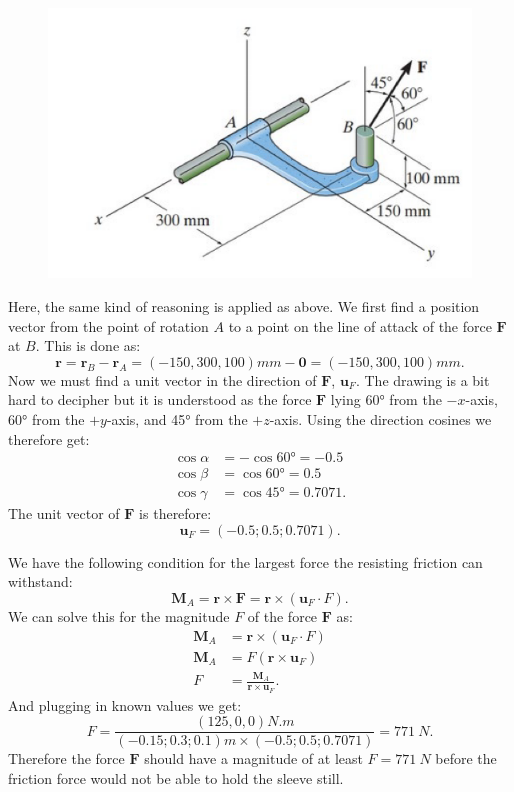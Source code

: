 \documentclass[a4paper]{article}
\begin{document}
\begin{figure} [ht]
  \centering
  \includegraphics[width=0.35\linewidth]{../figures/P2_2.png}
\end{figure}
\bigbreak
Here, the same kind of reasoning is applied as above. We first find a position vector from the point of rotation $A$ to a point on the line of attack of the force $\textbf{F}$ at $B$. This is done as:
\[ 
\textbf{r} = \textbf{r}_B - \textbf{r}_{A} = \left( - 150, 300, 100 \right) \unit{mm} - \textbf{0} =  \left( - 150, 300, 100 \right) \unit{mm} 
.\]
Now we must find a unit vector in the direction of $\textbf{F}$, $\textbf{u}_F$. The drawing is a bit hard to decipher but it is understood as the force $\textbf{F}$ lying \ang{60} from the $-x$-axis, \ang{60} from the $+y$-axis, and \ang{45} from the $+z$-axis. Using the direction cosines we therefore get:
\begin{align*}
  \cos \alpha &= - \cos \ang{60} = - \num{0,5} \\
  \cos \beta &= \cos \ang{60} = \num{0,5}  \\
  \cos \gamma &= \cos \ang{45} = \num{0,7071} 
.\end{align*}
The unit vector of $\textbf{F}$ is therefore:
\[ 
\textbf{u}_F = \left( -\num{0,5} ; \num{0,5} ; \num{0,7071}  \right)
.\]

We have the following condition for the largest force the resisting friction can withstand:
\[ 
\textbf{M}_{A} = \textbf{r} \times \textbf{F} = \textbf{r} \times \left( \textbf{u}_F \cdot F \right)
.\]
We can solve this for the magnitude $F$ of the force $\textbf{F}$ as:
\begin{align*}
  \textbf{M}_A &= \textbf{r} \times \left( \textbf{u}_F \cdot F \right) \\
  \textbf{M}_A &= F \left( \textbf{r} \times \textbf{u}_F \right) \\
  F &= \frac{\textbf{M}_A}{\textbf{r} \times \textbf{u}_F}
.\end{align*}
And plugging in known values we get:
\[ 
F = \frac{\left( 125, 0, 0 \right) \unit{N.m}}{\left( - \num{0,15} ; \num{0,3} ; \num{0,1}  \right)\unit{m} \times \left( -\num{0,5} ; \num{0,5} ; \num{0,7071}  \right)} = \qty{771}{N}
.\]
Therefore the force $\textbf{F}$ should have a magnitude of at least $F = \qty{771}{N}$ before the friction force would not be able to hold the sleeve still. 
\end{document}
